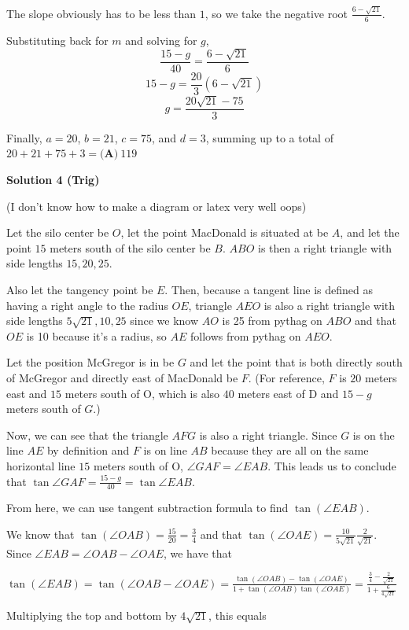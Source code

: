 \begin{enumerate}
 The slope obviously has to be less than $1$, so we take the negative root $\frac{6-\sqrt{21}}{6}$.

 Substituting back for $m$ and solving for $g$, 
 \[\frac{15-g}{40}=\frac{6-\sqrt{21}}{6}\] 
 \[15-g=\frac{20}{3}(6-\sqrt{21})\] 
 \[g=\frac{20\sqrt{21}-75}{3}\]

 Finally, $a=20$, $b=21$, $c=75$, and $d=3$, summing up to a total of $20+21+75+3=\boxed{\textbf{(A)}~119}$




\textbf{Solution 4 (Trig)}

(I don't know how to make a diagram or latex very well oops)

 Let the silo center be $O$, let the point MacDonald is situated at be $A$, and let the point $15$ meters south of the silo center be $B$. $ABO$ is then a right triangle with side lengths $15, 20, 25$. 

 Also let the tangency point be $E$. Then, because a tangent line is defined as having a right angle to the radius $OE$, triangle $AEO$ is also a right triangle with side lengths $5\sqrt{21},10,25$ since we know $AO$ is 25 from pythag on $ABO$ and that $OE$ is 10 because it's a radius, so $AE$ follows from pythag on $AEO$.

 Let the position McGregor is in be $G$ and let the point that is both directly south of McGregor and directly east of MacDonald be $F$. (For reference, $F$ is $20$ meters east and $15$ meters south of O, which is also $40$ meters east of D and $15-g$ meters south of $G$.)

 Now, we can see that the triangle $AFG$ is also a right triangle. Since $G$ is on the line $AE$ by definition and $F$ is on line $AB$ because they are all on the same horizontal line $15$ meters south of O, $\angle GAF=\angle EAB$. This leads us to conclude that $\tan{\angle GAF}=\frac{15-g}{40}=\tan{\angle EAB}$.

 From here, we can use tangent subtraction formula to find $\tan(\angle EAB)$.

 We know that $\tan(\angle OAB)=\frac{15}{20}=\frac34$ and that $\tan(\angle OAE)=\frac{10}{5\sqrt{21}}\frac2{\sqrt{21}}$. Since $\angle EAB = \angle OAB - \angle OAE$, we have that

 $\tan(\angle EAB)=\tan(\angle OAB - \angle OAE)=\frac{\tan(\angle OAB)-\tan(\angle OAE)}{1+\tan(\angle OAB)\tan(\angle OAE)}=\frac{\frac34-\frac2{\sqrt{21}}}{1+\frac6{4\sqrt{21}}}$

 Multiplying the top and bottom by $4\sqrt{21}$, this equals


\end{enumerate}
